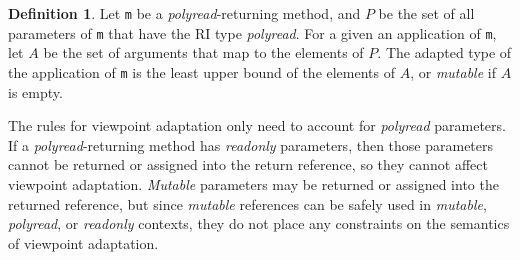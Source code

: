 \documentclass[letterpaper,11pt]{article}
\newcommand{\code}[1]{\lstinline$#1$}
\theoremstyle{definition}
\newtheorem{definition}{Definition}[section]
\theoremstyle{remark}
\begin{document}


\begin{definition}
	\label{viewadapt-def}
	Let \code{m} be a \emph{polyread}-returning method, and $P$ be the set of all
	parameters of \code{m} that have the RI type \emph{polyread}.
	For a given an application of \code{m}, let $A$ be the set of arguments that
	map to the elements of $P$.
	The adapted type of the application of \code{m} is the least upper bound
	of the elements of $A$, or \emph{mutable} if $A$ is empty.
\end{definition}

The rules for viewpoint adaptation only need to account for \emph{polyread} parameters.
If a \emph{polyread}-returning method has \emph{readonly} parameters,
then those parameters cannot be returned or assigned into the return reference,
so they cannot affect viewpoint adaptation.
\emph{Mutable} parameters may be returned or assigned into the returned reference,
but since \emph{mutable} references can be safely used in \emph{mutable}, \emph{polyread},
or \emph{readonly} contexts, they do not place any constraints on
the semantics of viewpoint adaptation.
\end{document}
